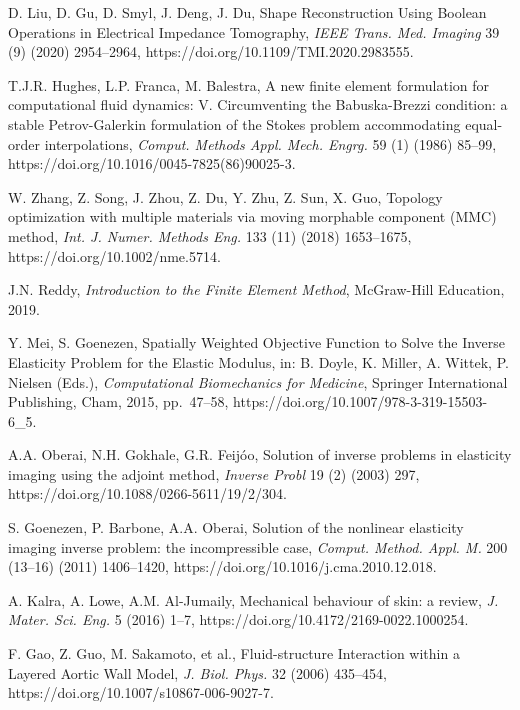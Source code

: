 \documentclass[11pt]{article}
\begin{document}
\begin{list}{}{%
  \setlength{\leftmargin}{2em}%
  \setlength{\itemindent}{-2em}%
  \setlength{\itemsep}{0.5em}%
  \setlength{\parsep}{0pt}%
}
\item [29] D. Liu, D. Gu, D. Smyl, J. Deng, J. Du, Shape
Reconstruction Using Boolean Operations in Electrical
Impedance Tomography, \emph{IEEE Trans. Med. Imaging} 39 (9)
(2020) 2954--2964, https://doi.org/10.1109/TMI.2020.2983555.

\item [30] T.J.R. Hughes, L.P. Franca, M. Balestra, A new
finite element formulation for computational fluid dynamics:
V. Circumventing the Babuska-Brezzi condition: a stable
Petrov-Galerkin formulation of the Stokes problem
accommodating equal-order interpolations, \emph{Comput. Methods
Appl. Mech. Engrg.} 59 (1) (1986) 85--99,
https://doi.org/10.1016/0045-7825(86)90025-3.

\item [31] W. Zhang, Z. Song, J. Zhou, Z. Du, Y. Zhu, Z. Sun,
X. Guo, Topology optimization with multiple materials via
moving morphable component (MMC) method, \emph{Int. J. Numer.
Methods Eng.} 133 (11) (2018) 1653--1675,
https://doi.org/10.1002/nme.5714.

\item [32] J.N. Reddy, \emph{Introduction to the Finite Element
Method}, McGraw-Hill Education, 2019.

\item [33] Y. Mei, S. Goenezen, Spatially Weighted Objective
Function to Solve the Inverse Elasticity Problem for the
Elastic Modulus, in: B. Doyle, K. Miller, A. Wittek, P. Nielsen
(Eds.), \emph{Computational Biomechanics for Medicine},
Springer International Publishing, Cham, 2015, pp.~47--58,
https://doi.org/10.1007/978-3-319-15503-6\_5.

\item [34] A.A. Oberai, N.H. Gokhale, G.R. Feij\'oo, Solution of
inverse problems in elasticity imaging using the adjoint
method, \emph{Inverse Probl} 19 (2) (2003) 297,
https://doi.org/10.1088/0266-5611/19/2/304.

\item [35] S. Goenezen, P. Barbone, A.A. Oberai, Solution of
the nonlinear elasticity imaging inverse problem: the
incompressible case, \emph{Comput. Method. Appl. M.} 200
(13--16) (2011) 1406--1420,
https://doi.org/10.1016/j.cma.2010.12.018.

\item [36] A. Kalra, A. Lowe, A.M. Al-Jumaily, Mechanical
behaviour of skin: a review, \emph{J. Mater. Sci. Eng.} 5
(2016) 1--7, https://doi.org/10.4172/2169-0022.1000254.

\item [37] F. Gao, Z. Guo, M. Sakamoto, et al., Fluid-structure
Interaction within a Layered Aortic Wall Model, \emph{J. Biol.
Phys.} 32 (2006) 435--454,
https://doi.org/10.1007/s10867-006-9027-7.


\end{list}
\end{document}
